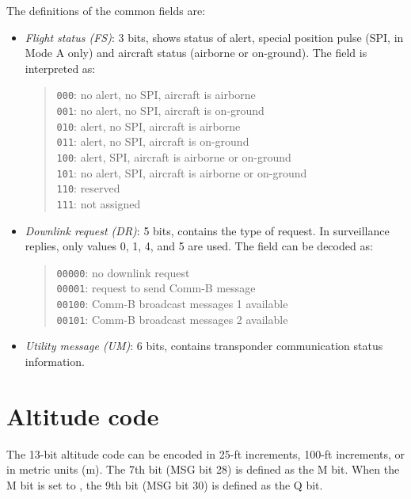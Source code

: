 The definitions of the common fields are:

\begin{itemize}
  \item \emph{Flight status (FS)}: 3 bits, shows status of alert, special position pulse (SPI, in Mode A only) and aircraft status (airborne or on-ground). The field is interpreted as:

  \begin{quote}
    \small
    \texttt{000}: no alert, no SPI, aircraft is airborne \\
    \texttt{001}: no alert, no SPI, aircraft is on-ground \\
    \texttt{010}: alert, no SPI, aircraft is airborne \\
    \texttt{011}: alert, no SPI, aircraft is on-ground \\
    \texttt{100}: alert, SPI, aircraft is airborne or on-ground \\
    \texttt{101}: no alert, SPI, aircraft is airborne or on-ground \\
    \texttt{110}: reserved \\
    \texttt{111}: not assigned
  \end{quote}

  \item \emph{Downlink request (DR)}: 5 bits, contains the type of request. In surveillance replies, only values 0, 1, 4, and 5 are used. The field can be decoded as:

  \begin{quote}
    \small
    \texttt{00000}: no downlink request \\
    \texttt{00001}: request to send Comm-B message \\
    \texttt{00100}: Comm-B broadcast messages 1 available \\
    \texttt{00101}: Comm-B broadcast messages 2 available
  \end{quote}

  \item \emph{Utility message (UM)}: 6 bits, contains transponder communication status information.


\end{itemize}



\section{Altitude code} \label{sec:alt_code}

The 13-bit altitude code can be encoded in 25-ft increments, 100-ft increments, or in metric units (m). The 7th bit (MSG bit 28) is defined as the M bit. When the M bit is set to \0, the 9th bit (MSG bit 30) is defined as the Q bit.

